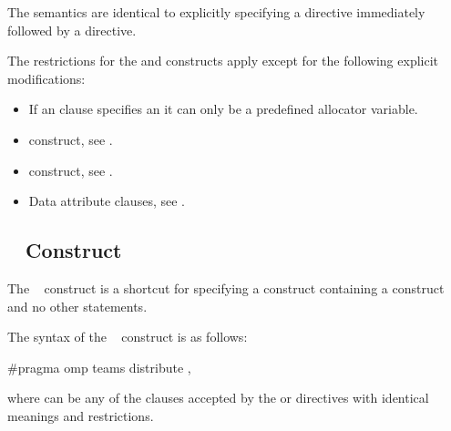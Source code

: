 \descr

The semantics are identical to explicitly specifying a  directive
immediately followed by a  directive.

\restrictions
The restrictions for the  and  constructs apply except for the following explicit modifications:

\begin{itemize}

\item If an  clause specifies an  it can only be a predefined allocator variable.

\end{itemize}

\crossreferences
\begin{itemize}
\item {} construct, see
.

\item {} construct, see
.

\item Data attribute clauses, see
.
\end{itemize}










\subsection{~ Construct}
\label{subsec:teams distribute Construct}
\summary
The ~ construct is a shortcut for specifying a  construct
containing a  construct and no other statements.

\syntax
\begin{ccppspecific}
The syntax of the ~ construct is as follows:

\begin{ompcPragma}
#pragma omp teams distribute \plc{[clause[ [},\plc{] clause] ... ] new-line}
\end{ompcPragma}

where  can be any of the clauses accepted by the  or 
directives with identical meanings and restrictions.
\end{ccppspecific}

